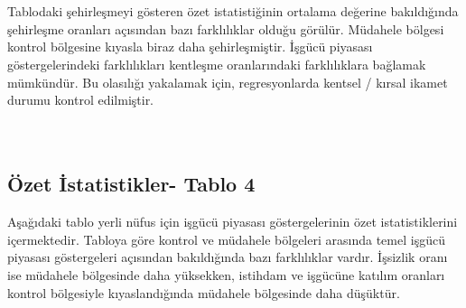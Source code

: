 \documentclass{article}
\begin{document}
 \\
 \\
Tablodaki şehirleşmeyi gösteren özet istatistiğinin ortalama değerine bakıldığında şehirleşme oranları açısından bazı farklılıklar olduğu görülür. Müdahele bölgesi kontrol bölgesine kıyasla biraz daha şehirleşmiştir. İşgücü piyasası göstergelerindeki farklılıkları kentleşme oranlarındaki farklılıklara bağlamak mümkündür. Bu olasılığı yakalamak için, regresyonlarda kentsel / kırsal ikamet durumu kontrol edilmiştir.
\\
\\
\\

\newpage
    \subsection*{Özet İstatistikler- Tablo 4}
  Aşağıdaki tablo yerli nüfus için işgücü piyasası göstergelerinin özet istatistiklerini içermektedir. Tabloya göre kontrol ve müdahele bölgeleri arasında temel işgücü piyasası göstergeleri açısından bakıldığında bazı farklılıklar vardır. İşsizlik oranı ise müdahele bölgesinde daha yüksekken, istihdam ve işgücüne katılım oranları kontrol bölgesiyle kıyaslandığında müdahele bölgesinde daha düşüktür. 
\end{document}
